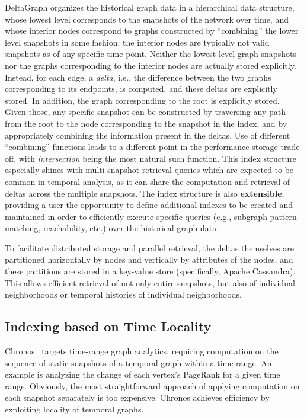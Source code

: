 \documentclass{svjour3}
\begin{document}
\vspace{2mm}
 DeltaGraph organizes the historical graph data in a hierarchical data structure, whose lowest level corresponds
to the snapshots of the network over time, and whose interior nodes correspond to graphs constructed by ``combining''
the lower level snapshots in some fashion; the interior nodes are typically not valid snapshots as of any specific time point. Neither the lowest-level
graph snapshots nor the graphs corresponding to the interior nodes are actually stored explicitly. Instead, for each edge, a {\em delta}, i.e., the
difference between the two graphs corresponding to its endpoints, is computed, and these deltas are explicitly stored. In addition, the graph
corresponding to the root is explicitly stored. Given those, any specific snapshot can be constructed by traversing any
path from the root to the node corresponding to the snapshot in the index, and by appropriately combining the information present in the deltas.
Use of different ``combining'' functions leads to a different point in the performance-storage trade-off, with {\em intersection} being the most
natural such function.  This index structure especially shines with multi-snapshot retrieval queries which are expected to be common in temporal 
analysis, as it can share the computation and retrieval of deltas across the multiple snapshots.
The index structure is also {\bf extensible}, providing a user the opportunity to define additional 
indexes to be created and maintained in order to efficiently execute specific queries (e.g., subgraph pattern matching, reachability, etc.)
    over the historical graph data.

To facilitate distributed storage and parallel retrieval, the deltas themselves are partitioned horizontally by nodes and vertically by attributes 
of the nodes, and these partitions are stored in a key-value store (specifically, Apache Cassandra). This allows efficient retrieval of not only
entire snapshots, but also of individual neighborhoods or temporal histories of individual neighborhoods.


\subsection{Indexing based on Time Locality}
Chronos~\cite{han2014chronos} targets time-range graph analytics, requiring computation on the sequence of static snapshots of a temporal graph within a time range. An example is analyzing the change of each vertex's PageRank for a given time range. Obviously, the most straightforward approach of applying computation on each snapshot separately is too expensive. Chronos achieves efficiency by exploiting locality of temporal graphs.
\end{document}
